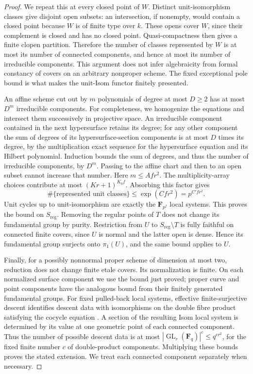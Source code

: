 \begin{proof}
We repeat this at every closed point of $W$. Distinct unit-isomorphism
classes give disjoint open subsets: an intersection, if nonempty, would
contain a closed point because $W$ is of finite type over $k$. These opens
cover $W$, since their complement is closed and has no closed point.
Quasi-compactness then gives a finite clopen partition. Therefore the
number of classes represented by $W$ is at most its number of connected
components, and hence at most its number of irreducible components.
This argument does not infer algebraicity from formal constancy of
covers on an arbitrary nonproper scheme. The fixed exceptional pole
bound is what makes the unit-Isom functor finitely presented.

An affine scheme cut out by $m$ polynomials of degree at most $D\ge2$
has at most $D^m$ irreducible components. For completeness, we homogenize
the equations and intersect them successively in projective space.
An irreducible component contained in the next hypersurface retains its
degree; for any other component the sum of degrees of its
hypersurface-section components is at most $D$ times its degree, by
the multiplication exact sequence for the hypersurface equation and
its Hilbert polynomial. Induction bounds the sum of degrees, and thus
the number of irreducible components, by $D^m$. Passing to the affine
chart and then to an open subset cannot increase that number. Here
$m\le Afr^2$. The multiplicity-array choices contribute at most
$(Kr+1)^{K_0f}$. Absorbing this factor gives
\[
 \#\{\text{represented unit classes}\}\le\exp(Cfr^2)
 =p^{C'fr^2}.
\]
Unit cycles up to unit-isomorphism are exactly the $\mathbf F_{p^f}$
local systems. This proves the bound on $S_{\mathrm{reg}}$. Removing
the regular points of $T$ does not change its fundamental group by
purity. Restriction from $U$ to $S_{\mathrm{reg}}\setminus T$ is fully
faithful on connected finite covers, since $U$ is normal and the latter
open is dense. Hence its fundamental group surjects onto $\pi_1(U)$,
and the same bound applies to $U$.

Finally, for a possibly nonnormal proper scheme of dimension at most two,
reduction does not change finite etale covers. Its normalization is
finite. On each normalized surface component we use the bound just
proved; proper curve and point components have the analogous bound
from their finitely generated fundamental groups. For fixed pulled-back
local systems, effective finite-surjective descent identifies descent
data with isomorphisms on the double fibre product satisfying the
cocycle equation
\citep[Expose~IX, Theorem~4.7]{C_SGA1}. A section of the resulting Isom
local system is determined by its value at one geometric point of each
connected component. Thus the number of possible descent data is at
most $|\operatorname{GL}_r(\mathbf F_q)|^c\le q^{cr^2}$, for the fixed
finite number $c$ of double-product components. Multiplying these bounds
proves the stated extension. We treat each connected component separately
when necessary.
\end{proof}
